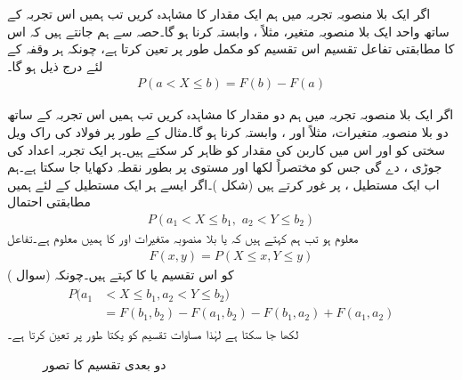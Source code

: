 اگر ایک بلا منصوبہ تجربہ میں ہم ایک مقدار کا مشاہدہ کریں تب ہمیں اس تجربہ کے ساتھ واحد ایک بلا منصوبہ متغیر، مثلاً ، وابستہ کرنا ہو گا۔حصہ  سے ہم جانتے ہیں کہ اس کا مطابقتی تفاعل تقسیم  اس تقسیم کو مکمل طور پر تعین کرتا ہے، چونکہ ہر وقفہ  کے لئے درج ذیل ہو گا۔
\begin{align*}
P(a<X\le b)=F(b)-F(a)
\end{align*}

اگر ایک بلا منصوبہ تجربہ میں ہم دو مقدار کا مشاہدہ کریں تب ہمیں اس تجربہ کے ساتھ دو بلا منصوبہ متغیرات، مثلاً  اور ، وابستہ کرنا ہو گا۔مثال کے طور پر فولاد کی راک ویل سختی کو    اور اس میں کاربن کی مقدار کو  ظاہر کر سکتے ہیں۔ہر ایک تجربہ اعداد کی جوڑی ،  دے گی جس کو مختصراً  لکھا اور  مستوی پر بطور نقطہ دکھایا جا سکتا ہے۔ہم اب ایک مستطیل ،  پر غور کرتے ہیں (شکل )۔اگر ایسے ہر ایک مستطیل کے لئے  ہمیں مطابقتی احتمال
\begin{align*}
P(a_1<X\le b_1,\,\, a_2<Y\le b_2)
\end{align*}
معلوم ہو تب ہم کہتے ہیں کہ   یا بلا منصوبہ متغیرات  اور  کا  ہمیں معلوم ہے۔تفاعل
\begin{align}\label{مساوات_شماریات_ایک_سے_زائد_الف}
F(x,y)=P(X\le x,Y\le y)
\end{align}
کو اس تقسیم یا  کا  کہتے ہیں۔چونکہ (سوال )
\begin{gather}
\begin{aligned}\label{مساوات_شماریات_ایک_سے_زائد_ب}
P(a_1&<X\le b_1,a_2<Y\le b_2)\\
&=F(b_1,b_2)-F(a_1,b_2)-F(b_1,a_2)+F(a_1,a_2)
\end{aligned}
\end{gather}
لکھا جا سکتا ہے لہٰذا مساوات  تقسیم کو یکتا طور پر تعین کرتا ہے۔
\begin{figure}
\centering
{}
\caption{دو بعدی تقسیم کا تصور}
\label{شکل_شماریات_دو_بعدی_تقسیم}
\end{figure}

